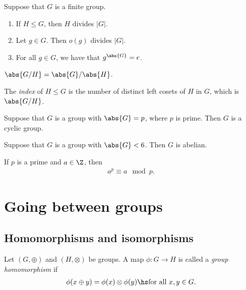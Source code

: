 \documentclass{article}
\begin{document}
\begin{theorem}
    Suppose that $G$ is a finite group.
    \begin{enumerate}
        \item If $H\leq G$, then $H$ divides $|G|$.
        \item Let $g\in G$. Then $o(g)$ divides $|G|$.
        \item For all $g\in G$, we have that $g^{\abs{G}}=e$.
    \end{enumerate}
\end{theorem}

\begin{corollary}
    $\abs{G / H}= \abs{G}/\abs{H}$.
\end{corollary}

\begin{definition}
    The \emph{index} of $H\leq G$ is the number of distinct
    left cosets of $H$ in $G$, which is $\abs{G/H}$.
\end{definition}

\begin{theorem}
    Suppose that $G$ is a group with $\abs{G}=p$, where $p$ is
    prime. Then $G$ is a cyclic group.
\end{theorem}

\begin{corollary}
    Suppose that $G$ is a group with $\abs{G}<6$. Then $G$ is abelian.
\end{corollary}

\begin{theorem}
    If $p$ is a prime and $a\in\Z$, then
    \begin{align*}
        a^{p}\equiv a \mod p.
    \end{align*}
\end{theorem}


\section{Going between groups}


\subsection{Homomorphisms and isomorphisms}

\begin{definition}
    Let $(G, \oplus)$ and $(H, \otimes)$ be groups. A map $\phi:G\to H$ 
    is called a \emph{group homomorphism} if
    \begin{align*}
        \phi(x \oplus y) = \phi(x)\otimes \phi(y)\hs\text{for all }x,y\in G.
    \end{align*}
\end{definition}
\end{document}

